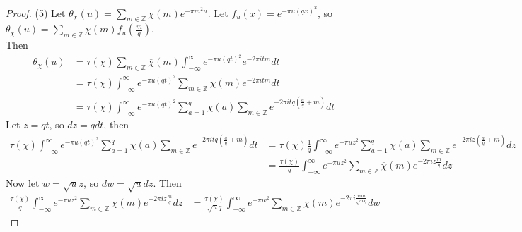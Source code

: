 \documentclass[reqno]{amsart}
\theoremstyle{definition}
\theoremstyle{remark}
\begin{document}
\begin{proof}
    (5) Let
    $\theta_{\chi}(u) = 
    \sum_{m \in \mathbb{Z}}\chi(m) e^{-\pi m^2 u}$.
    Let $f_u(x) = e^{- \pi u (qx)^2}$, so
    $\theta_{\chi}(u) = 
    \sum_{m \in \mathbb{Z}} \chi(m)
    f_u (\frac{m}{q})$.\\
    \linebreak
    Then
    \begin{align*}
        \theta_{\chi}(u)
        &= \tau (\chi) 
        \sum_{m \in \mathbb{Z}}
        \overline{\chi}(m)
        \int_{-\infty}^{\infty} 
        e^{- \pi u (qt)^2}
        e^{-2 \pi i t m} dt\\
        &= \tau (\chi) 
        \int_{-\infty}^{\infty} 
        e^{- \pi u (qt)^2}
        \sum_{m \in \mathbb{Z}}\overline{\chi}(m)
        e^{- 2 \pi i t m } dt\\
        &= 
        \tau(\chi) 
        \int_{-\infty}^{\infty} e^{-\pi u (qt)^2}
        \sum_{a=1}^{q}
        \overline{\chi}(a)
        \sum_{m \in \mathbb{Z}}
        e^{-2 \pi i t q \left( \frac{a}{q} + m \right) } dt
    \end{align*}
    Let
    $z = qt$, so
    $dz = q dt$, then
    \begin{align*}
        \tau(\chi) 
        \int_{-\infty}^{\infty} e^{-\pi u (qt)^2}
        \sum_{a=1}^{q}
        \overline{\chi}(a)
        \sum_{m \in \mathbb{Z}}
        e^{-2 \pi i t q \left( \frac{a}{q} + m \right) } dt
        &= \tau(\chi) \frac{1}{q}
        \int_{-\infty}^{\infty} e^{- \pi u z^2}
        \sum_{a=1}^{q} \overline{\chi}(a)
        \sum_{m \in \mathbb{Z}}
        e^{- 2 \pi i z \left( \frac{a}{q}+m \right) } dz\\
        &= \frac{\tau(\chi)}{q}
        \int_{-\infty}^{\infty} 
        e^{- \pi u z^2} \sum_{m \in \mathbb{Z}}
        \overline{\chi}(m) e^{- 2 \pi i z \frac{m}{q}}dz
    \end{align*}
    Now let
    $w = \sqrt{u} z $, so
    $dw = \sqrt{u}  dz$. Then
    \begin{align*}
        \frac{\tau(\chi)}{q}
        \int_{-\infty}^{\infty} 
        e^{- \pi u z^2} \sum_{m \in \mathbb{Z}}
        \overline{\chi}(m) e^{- 2 \pi i z \frac{m}{q}}dz
        &= 
        \frac{\tau(\chi)}{\sqrt{u} q}
        \int_{-\infty}^{\infty} 
        e^{- \pi w^2} \sum_{m \in \mathbb{Z}}
        \overline{\chi}(m) e^{-2 \pi i \frac{wm}{\sqrt{u} q }} 
        dw
    \end{align*}


\end{proof}
\end{document}
